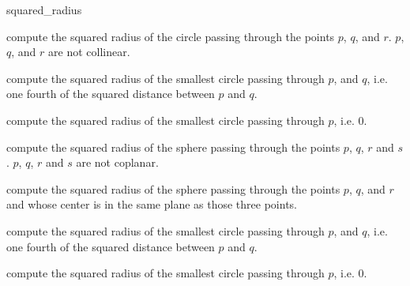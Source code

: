 \begin{ccRefFunction}{squared_radius}

 {compute the squared radius of the circle passing through the points
 $p$, $q$, and $r$.  \ccPrecond $p$, $q$, and $r$ are not collinear.}

{compute the squared radius of the smallest circle passing through $p$,
and $q$, i.e. one fourth of the squared distance between $p$ and $q$.}

{compute the squared radius of the smallest circle passing through $p$, 
i.e. $0$.}

 {compute the squared radius of the sphere passing through the points $p$,
 $q$, $r$ and $s$.  \ccPrecond $p$, $q$, $r$ and $s$ are not coplanar.}

 {compute the squared radius of the sphere passing through the points $p$,
 $q$, and $r$ and whose center is in the same plane as those three points.}

{compute the squared radius of the smallest circle passing through $p$,
and $q$, i.e. one fourth of the squared distance between $p$ and $q$.}

{compute the squared radius of the smallest circle passing through $p$, 
i.e. $0$.}

\ccSeeAlso
{} \\
 \\
 \\

\end{ccRefFunction}
